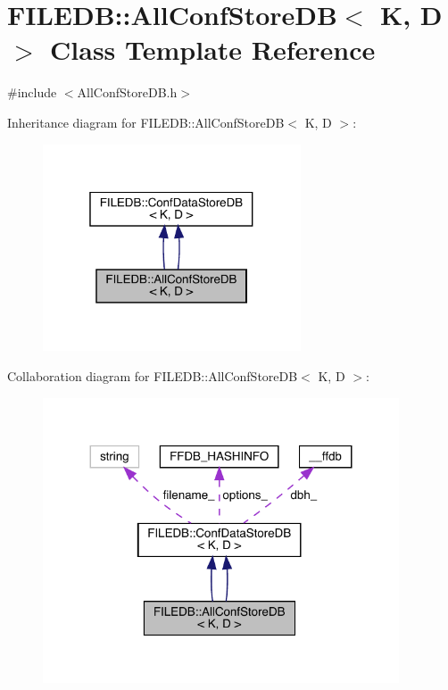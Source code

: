 \hypertarget{classFILEDB_1_1AllConfStoreDB}{}\section{F\+I\+L\+E\+DB\+:\+:All\+Conf\+Store\+DB$<$ K, D $>$ Class Template Reference}
\label{classFILEDB_1_1AllConfStoreDB}


{\ttfamily \#include $<$All\+Conf\+Store\+D\+B.\+h$>$}



Inheritance diagram for F\+I\+L\+E\+DB\+:\+:All\+Conf\+Store\+DB$<$ K, D $>$\+:\nopagebreak
\begin{figure}[H]
\begin{center}
\leavevmode
\includegraphics[width=217pt]{d6/d56/classFILEDB_1_1AllConfStoreDB__inherit__graph}
\end{center}
\end{figure}


Collaboration diagram for F\+I\+L\+E\+DB\+:\+:All\+Conf\+Store\+DB$<$ K, D $>$\+:\nopagebreak
\begin{figure}[H]
\begin{center}
\leavevmode
\includegraphics[width=299pt]{d4/d50/classFILEDB_1_1AllConfStoreDB__coll__graph}
\end{center}
\end{figure}
